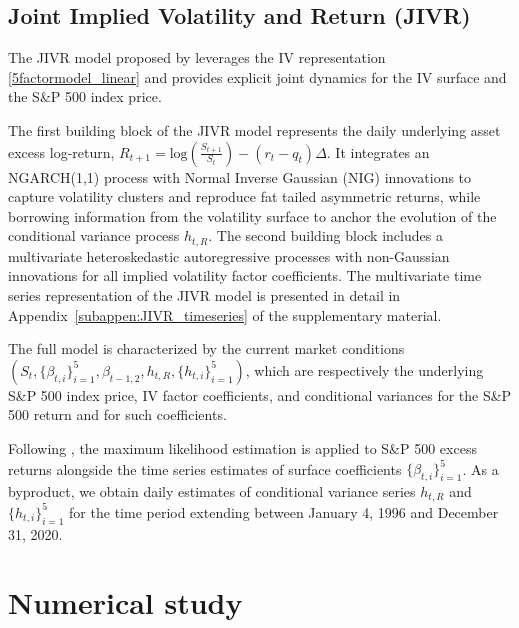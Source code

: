 \documentclass[12pt]{article}
\begin{document}
\subsection{Joint Implied Volatility and Return (JIVR)}\label{subsec:JIVR}

The JIVR model proposed by \cite{Frnacois2023} leverages the IV representation \eqref{5factormodel_linear} and provides explicit joint dynamics for the IV surface and the S\&P 500 index price.

The first building block of the JIVR model represents the daily underlying asset excess log-return, $R_{t+1}=\mbox{log} \left(\frac{S_{t+1}}{S_{t}}\right)-(r_{t}-q_{t})\Delta$. It integrates an NGARCH(1,1) process with Normal Inverse Gaussian (NIG) innovations to capture volatility clusters and reproduce fat tailed asymmetric returns, while borrowing information from the volatility surface to anchor the evolution of the conditional variance process $h_{t,R}$. %
The second building block includes a multivariate heteroskedastic autoregressive processes with non-Gaussian innovations for all implied volatility factor coefficients. 
The multivariate time series representation of the JIVR model is presented in detail in \mbox{Appendix \ref{subappen:JIVR_timeseries}} of the supplementary material.

The full model is characterized by the current market conditions $\left(S_t,\{ \beta_{t,i} \}^5_{i=1}, \beta_{t-1,2}, h_{t,R}, \{ h_{t,i}\}^5_{i=1}  \right)$, which are respectively the underlying S\&P 500 index price, IV factor coefficients, and conditional variances for the S\&P 500 return and for such coefficients.

Following \cite{Frnacois2023}, the maximum likelihood estimation is applied to S\&P 500 excess returns alongside the time series estimates of surface coefficients $\{ \beta_{t,i} \}^5_{i=1}$. As a byproduct, we obtain daily estimates of conditional variance series $h_{t,R}$ and $\{ h_{t,i}\}^5_{i=1}$ for the time period extending between January 4, 1996 and December 31, 2020.  


\section{Numerical study}\label{se:SSG}
\end{document}
